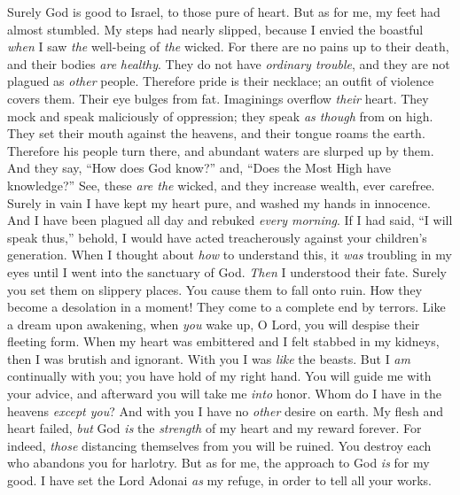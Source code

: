 \begin{biblechapter} %
 Surely God is good to Israel, 
to those pure of heart.
\verse But as for me, my feet had almost stumbled. 
My steps had nearly slipped,
\verse because I envied the boastful 
\textit{when} I saw \textit{the} well-being of \textit{the} wicked.
\verse For there are no pains up to their death, 
and their bodies \textit{are} \textit{healthy}.
\verse They do not have \textit{ordinary trouble}, 
and they are not plagued as \textit{other} people.
\verse Therefore pride is their necklace; 
an outfit of violence covers them.
\verse Their eye bulges from fat. 
Imaginings overflow \textit{their} heart.
\verse They mock and speak maliciously of oppression; 
they speak \textit{as though} from on high.
\verse They set their mouth against the heavens, 
and their tongue roams the earth.
\verse Therefore his people turn there, 
and abundant waters are slurped up by them.
\verse And they say, “How does God know?” 
and, “Does the Most High have knowledge?”
\verse See, these \textit{are the} wicked, 
and they increase wealth, ever carefree.
\verse Surely in vain I have kept my heart pure, 
and washed my hands in innocence.
\verse And I have been plagued all day 
and rebuked \textit{every morning}.
\verse If I had said, “I will speak thus,” 
behold, I would have acted treacherously 
against your children’s generation.
\verse When I thought about \textit{how} to understand this, 
it \textit{was} troubling in my eyes
\verse until I went into the sanctuary of God. 
\textit{Then} I understood their fate.
\verse Surely you set them on slippery places. 
You cause them to fall onto ruin.
\verse How they become a desolation in a moment! 
They come to a complete end by terrors.
\verse Like a dream upon awakening, 
when \textit{you} wake up, O Lord, 
you will despise their fleeting form.
\verse When my heart was embittered 
and I felt stabbed in my kidneys,
\verse then I was brutish and ignorant. 
With you I was \textit{like} the beasts.
\verse But I \textit{am} continually with you; 
you have hold of my right hand.
\verse You will guide me with your advice, 
and afterward you will take me \textit{into} honor.
\verse Whom do I have in the heavens \textit{except you}? 
And with you I have no \textit{other} desire on earth.
\verse My flesh and heart failed, 
\textit{but} God \textit{is} the \textit{strength} of my heart and my reward forever.
\verse For indeed, \textit{those} distancing themselves from you will be ruined. 
You destroy each who abandons you for harlotry.
\verse But as for me, the approach to God \textit{is} for my good. 
I have set the Lord Adonai \textit{as} my refuge, 
in order to tell all your works.
\end{biblechapter}

